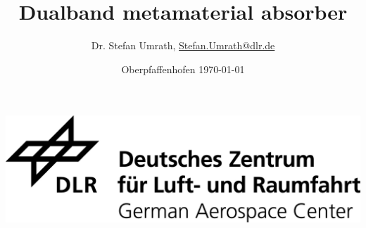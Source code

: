 \documentclass[a4paper,12pt]{scrartcl}  %
\title{Dualband metamaterial absorber}
\author[1]{Dr. Stefan Umrath, \href{mailto:Stefan.Umrath@dlr.de}{Stefan.Umrath@dlr.de}}
\affil[1]{German Aerospace Center (DLR)}
\date{Oberpfaffenhofen \today{} \vspace{3cm}}
\begin{document}
\maketitle
\begin{center}
\includegraphics[width= 0.75\linewidth]{./media/DLR_Logo_engl_schwarz.jpg}
\end{center}

\newpage
\tableofcontents 
\newpage


\newpage

\newpage

\newpage

\newpage

\newpage 




\newpage


\printbibliography
\end{document}
